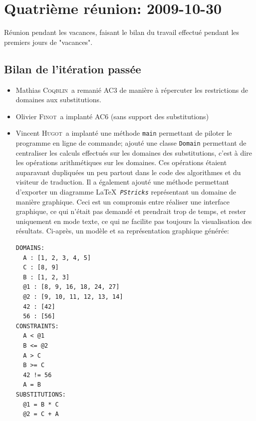 \documentclass[a4paper,12pt]{article}
\def\tech{\texttt}
\def\familyname{\textsc}
\def\firstname#1{#1}
\def\groupmember#1#2{\firstname{#1} \familyname{#2}}
\def\mmat{\groupmember{Mathias}{Coqblin}}
\def\moli{\groupmember{Olivier}{Finot}}
\def\mvin{\groupmember{Vincent}{Hugot}}
\begin{document}
\section{Quatrième réunion: 2009-10-30}

Réunion pendant les vacances, faisant le bilan du travail
effectué pendant les premiers jours de "vacances".

\subsection{Bilan de l'itération passée}

\begin{itemize}
 \item \mmat\ a remanié AC3 de manière à répercuter les restrictions de domaines aux
 substitutions. 
\item \moli\ a implanté AC6 (sans support des substitutions)
\item \mvin\ a implanté une méthode \texttt{main} permettant de piloter le programme
  en ligne de commande; ajouté une classe \tech{Domain} permettant
  de centraliser les calculs effectués sur les domaines des substitutions,
  c'est à dire les opérations arithmétiques sur les domaines. 
  Ces opérations étaient auparavant dupliquées un peu partout dans le
  code des algorithmes et du visiteur de traduction.
  Il a également ajouté une méthode permettant d'exporter 
  un diagramme \LaTeX\ \texttt{\emph{PStricks}} représentant un domaine
  de manière graphique. Ceci est un compromis entre réaliser
  une interface graphique, ce qui n'était pas demandé et
  prendrait trop de temps, et rester uniquement en mode texte,
  ce qui ne facilite pas toujours la visualisation des résultats.
  Ci-après, un modèle et sa représentation graphique générée:
  \begin{verbatim}
DOMAINS:
  A : [1, 2, 3, 4, 5]
  C : [8, 9]
  B : [1, 2, 3]
  @1 : [8, 9, 16, 18, 24, 27]
  @2 : [9, 10, 11, 12, 13, 14]
  42 : [42]
  56 : [56]
CONSTRAINTS:
  A < @1
  B <= @2
  A > C
  B >= C
  42 != 56
  A = B
SUBSTITUTIONS:
  @1 = B * C
  @2 = C + A
  \end{verbatim}



\end{itemize}
\end{document}
